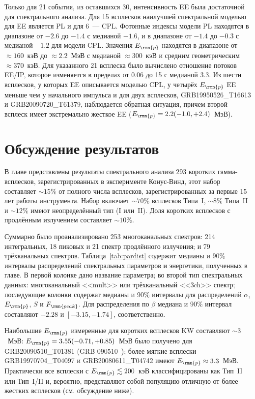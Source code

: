 Только для 21 события, из оставшихся 30, интенсивность EE была достаточной для спектрального анализа.
Для 15 всплесков наилучшей спектральной моделью для EE является PL и для 6~--- CPL.   
Фотонные индексы модели PL находятся в диапазоне от $-2.6$ до $-1.4$ с медианой $-1.6$,
и в диапазоне от $-1.4$ до $-0.3$ с медианой $-1.2$ для модели CPL.
Значения $E_\rmn{p}$ находятся в диапазоне от $\approx160$~кэВ до $\approx 2.2$~МэВ с медианой $\approx300$~кэВ
и средним геометрическим $\approx370$~кэВ. 
Для указанного 21 всплеска было вычислено отношение потоков EE/IP, 
которое изменяется в пределах от 0.06 до 15 с медианой 3.3. 
Из шести всплесков, у которых EE описывается моделью CPL, у четырёх $E_\rmn{p}$ EE 
меньше чем у начального импульса и для двух всплесков, GRB19950526\_T16613 и GRB20090720\_T61379, 
наблюдается обратная ситуация, причем второй всплеск имеет экстремально
жесткое EE ($E_\rmn{p} = 2.2(-1.0,+2.4)$~МэВ).


\section{Обсуждение результатов}\label{sec:SUMMARY}
В главе представлены результаты спектрального анализа 293 коротких гамма-всплесков,
зарегистрированных в эксперименте Конус-Винд, этот набор составляет $\sim 15$\% 
от полного числа всплесков, зарегистрированных за первые 15 лет работы инструмента.
Набор включает $\sim 70$\% всплесков Типа~I, $\sim 8$\% Типа~II и $\sim 12$\%
имеют неопределённый тип (I или~II). Доля коротких всплесков с продлённым 
излучением составляет $\sim 10$\%.

Суммарно было проанализировано 253 многоканальных спектров: 214 интегральных,
18 пиковых и 21 спектр продлённого излучения; и 79 трёхканальных спектров.
Таблица~\ref{tab:pardist} содержит медианы и 90\% интервалы распределений спектральных
параметров и энергетики, полученных в главе. В первой колонке дано название параметра;
во второй тип спектральных данных: многоканальный <<mult>> или трёхканальный <<3ch>> спектр;
последующие колонки содержат медианы и 90\% интервалы для распределений
$\alpha$, $E_\rmn{p}$, $S$ и $F_\rmn{peak}$. Для распределения по $\beta$
медиана и 90\% интервал составляют $-2.28$ и $[-3.15,-1.74]$, соответственно.

Наибольшие $E_\rmn{p}$ измеренные для коротких всплесков KW составляют $\sim 3$~МэВ: 
$E_\rmn{p} = 3.55(-0.71,+0.85)$~МэВ было получено для GRB20090510\_T01381
(GRB 090510~\citep{Ackermann_2010ApJ_716_1178A});
более мягкие всплески GRB19970704\_T04097 и GRB20080611\_T04742 имеют $E_\rmn{p} \approx 3.3$~МэВ.
Практически все всплески с $E_\rmn{p} \lesssim 200$~кэВ классифицированы как Тип~II или Тип~I/II
и, вероятно, представляют собой популяцию отличную от более жестких всплесков (см. обсуждение ниже).

